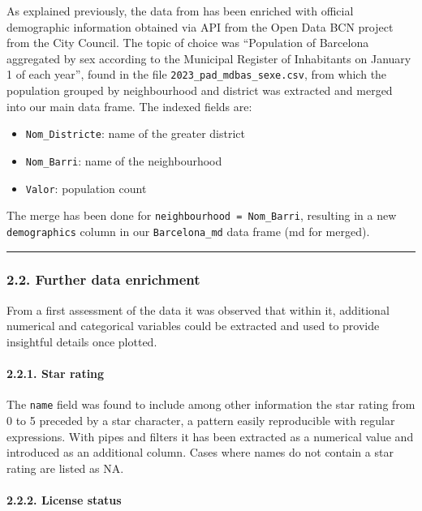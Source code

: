 \documentclass[
]{article}
\providecommand{\tightlist}{%
  \setlength{\itemsep}{0pt}\setlength{\parskip}{0pt}}
\begin{document}
As explained previously, the data from has been enriched with official
demographic information obtained via API from the Open Data BCN project
from the City Council. The topic of choice was ``Population of Barcelona
aggregated by sex according to the Municipal Register of Inhabitants on
January 1 of each year'', found in the file
\texttt{2023\_pad\_mdbas\_sexe.csv}, from which the population grouped
by neighbourhood and district was extracted and merged into our main
data frame. The indexed fields are:

\begin{itemize}
\tightlist
\item
  \texttt{Nom\_Districte}: name of the greater district
\item
  \texttt{Nom\_Barri}: name of the neighbourhood
\item
  \texttt{Valor}: population count
\end{itemize}

The merge has been done for \texttt{neighbourhood\ =\ Nom\_Barri},
resulting in a new \texttt{demographics} column in our
\texttt{Barcelona\_md} data frame (md for merged).

\begin{center}\rule{0.5\linewidth}{0.5pt}\end{center}

\hypertarget{further-data-enrichment}{%
\subsubsection{2.2. Further data
enrichment}\label{further-data-enrichment}}

From a first assessment of the data it was observed that within it,
additional numerical and categorical variables could be extracted and
used to provide insightful details once plotted.

\hypertarget{star-rating}{%
\paragraph{2.2.1. Star rating}\label{star-rating}}

The \texttt{name} field was found to include among other information the
star rating from 0 to 5 preceded by a star character, a pattern easily
reproducible with regular expressions. With pipes and filters it has
been extracted as a numerical value and introduced as an additional
column. Cases where names do not contain a star rating are listed as NA.

\hypertarget{license-status}{%
\paragraph{2.2.2. License status}\label{license-status}}
\end{document}
